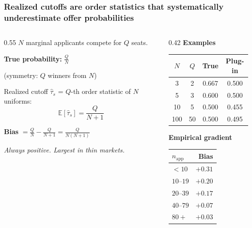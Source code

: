 \documentclass[aspectratio=169,11pt]{beamer}
\begin{document}
\begin{frame}
\frametitle{Realized cutoffs are order statistics that systematically
underestimate offer probabilities}

\begin{columns}[T]
\begin{column}{0.55\textwidth}
$N$ marginal applicants compete for $Q$ seats.

\vspace{0.3cm}
\textbf{\color{navy}True probability:} $\displaystyle\frac{Q}{N}$

{\small (symmetry: $Q$ winners from $N$)}

\vspace{0.3cm}
Realized cutoff $\hat\tau_s$ = $Q$-th order statistic of $N$ uniforms:
$$\mathbb{E}[\hat\tau_s] = \frac{Q}{N+1}$$

\vspace{0.2cm}
\textbf{\color{darkred}Bias} $= \displaystyle\frac{Q}{N} - \frac{Q}{N+1}
= \frac{Q}{N(N+1)}$

\vspace{0.2cm}
{\small\color{muted}\textit{Always positive. Largest in thin markets.}}
\end{column}

\begin{column}{0.42\textwidth}
\textbf{\color{accent}Examples}

\vspace{0.2cm}
\begin{tabular}{cccc}
\toprule
$N$ & $Q$ & True & Plug-in \\
\midrule
3 & 2 & 0.667 & 0.500 \\
5 & 3 & 0.600 & 0.500 \\
10 & 5 & 0.500 & 0.455 \\
100 & 50 & 0.500 & 0.495 \\
\bottomrule
\end{tabular}

\vspace{0.4cm}
\textbf{\color{accent}Empirical gradient}

\vspace{0.1cm}
{\small
\begin{tabular}{lr}
\toprule
$n_{\text{app}}$ & Bias \\
\midrule
$<10$ & $+0.31$ \\
$10$--$19$ & $+0.20$ \\
$20$--$39$ & $+0.17$ \\
$40$--$79$ & $+0.07$ \\
$80+$ & $+0.03$ \\
\bottomrule
\end{tabular}}
\end{column}
\end{columns}
\end{frame}
\end{document}
